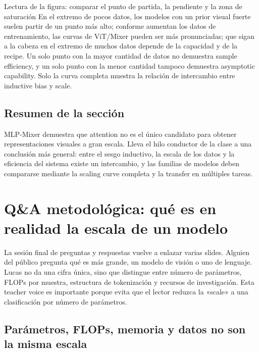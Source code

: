 \documentclass[a4paper]{article}
\begin{document}
\begin{knowledgebox}{Lectura de la figura: comparar el punto de partida, la pendiente y la zona de saturación}
En el extremo de pocos datos, los modelos con un prior visual fuerte suelen partir de un punto más alto; conforme aumentan los datos de entrenamiento, las curvas de ViT/Mixer pueden ser más pronunciadas; que sigan a la cabeza en el extremo de muchos datos depende de la capacidad y de la recipe. Un solo punto con la mayor cantidad de datos no demuestra sample efficiency, y un solo punto con la menor cantidad tampoco demuestra asymptotic capability. Solo la curva completa muestra la relación de intercambio entre inductive bias y scale.
\end{knowledgebox}


\subsection{Resumen de la sección}

MLP-Mixer demuestra que attention no es el único candidato para obtener representaciones visuales a gran escala. Lleva el hilo conductor de la clase a una conclusión más general: entre el sesgo inductivo, la escala de los datos y la eficiencia del sistema existe un intercambio, y las familias de modelos deben compararse mediante la scaling curve completa y la transfer en múltiples tareas.
\section{Q\&A metodológica: qué es en realidad la escala de un modelo}

La sesión final de preguntas y respuestas vuelve a enlazar varias slides. Alguien del público pregunta qué es más grande, un modelo de visión o uno de lenguaje. Lucas no da una cifra única, sino que distingue entre número de parámetros, FLOPs por muestra, estructura de tokenización y recursos de investigación. Esta teacher voice es importante porque evita que el lector reduzca la «scale» a una clasificación por número de parámetros.

\subsection{Parámetros, FLOPs, memoria y datos no son la misma escala}
\end{document}
